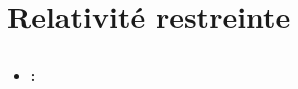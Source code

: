 \chapter{Relativité restreinte}

\section{}
\subsection{}
\begin{center}
\end{center}

\begin{itemize}[leftmargin=1cm, label=, itemsep=1pt]
\item {\bf :}
\end{itemize}

